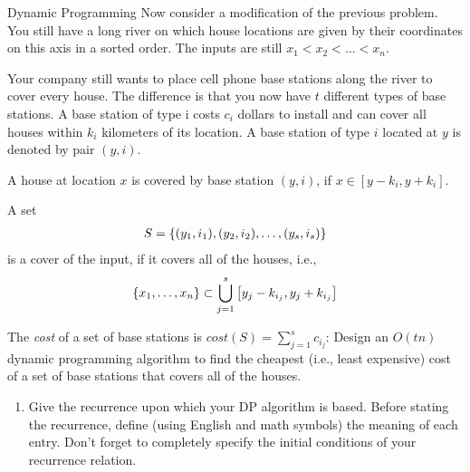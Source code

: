 \documentclass{article}
\numberwithin{table}{section}
\numberwithin{figure}{section}
\begin{document}
\newpage
\begin{section}{Dynamic Programming}
Now consider a modification of the previous problem. You still have a long river on which house locations are given by their coordinates on this axis in a sorted order. The inputs are still $x_1 < x_2 < \dots < x_n$.

Your company still wants to place cell phone base stations along the river to cover every house. The difference is that you now have $t$ different types of base stations. A base station of type i costs $c_i$ dollars to install and can cover all houses within $k_i$ kilometers of its location. A base station of type $i$ located at $y$ is denoted by pair $(y, i)$.

A house at location $x$ is covered by base station $(y, i)$, if $x \in [y - k_i, y + k_i]$.

A set 
\begin{align*}
    S = \left\{(y_1, i_1), (y_2, i_2), \dots , (y_s, i_s)\right\}
\end{align*}
is a cover of the input, if it covers all of the houses, i.e.,
\begin{align*}
    \left\{x_1, \dots, x_n\right\} \subset \bigcup_{j=1}^s \left[y_j - k_{i_j}, y_j + k_{i_j}\right]
\end{align*}

The \emph{cost} of a set of base stations is $cost(S) = \sum_{j=1}^s c_{i_j}$:
Design an $O(tn)$ dynamic programming algorithm to find the cheapest (i.e., least expensive) cost of a set of base stations that covers all of the houses.

\begin{enumerate}
    \item Give the recurrence upon which your DP algorithm is based. Before stating the recurrence, define (using English and math symbols) the meaning of each entry. Don’t forget to completely specify the initial conditions of your recurrence relation.
    

\end{enumerate}
\end{section}
\end{document}
